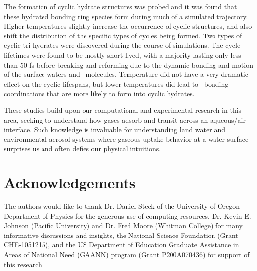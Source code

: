 \documentclass{article}
\begin{document}
The formation of cyclic hydrate structures was probed and it was found that these hydrated bonding ring species form during much of a simulated trajectory. Higher temperatures slightly increase the occurrence of cyclic structures, and also shift the distribution of the specific types of cycles being formed. Two types of cyclic tri-hydrates were discovered during the course of simulations. The cycle lifetimes were found to be mostly short-lived, with a majority lasting only less than 50 fs before breaking and reforming due to the dynamic bonding and motion of the surface waters and \suldiox~molecules. Temperature did not have a very dramatic effect on the cyclic lifespans, but lower temperatures did lead to \suldiox~bonding coordinations that are more likely to form into cyclic hydrates.

These studies build upon our computational and experimental research in this area, seeking to understand how gases adsorb and transit across an aqueous/air interface. Such knowledge is invaluable for understanding land water and environmental aerosol systems where gaseous uptake behavior at a water surface surprises us and often defies our physical intuitions.\cite{Jayne1990,Yang2002,Worsnop1989,Boniface2000}


\section {Acknowledgements}

The authors would like to thank Dr. Daniel Steck of the University of Oregon Department of Physics for the generous use of computing resources, Dr. Kevin E. Johnson (Pacific University) and Dr. Fred Moore (Whitman College) for many informative discussions and insights, the National Science Foundation (Grant CHE-1051215), and the US Department of Education Graduate Assistance in Areas of National Need (GAANN) program (Grant P200A070436) for support of this research.


\end{document}
